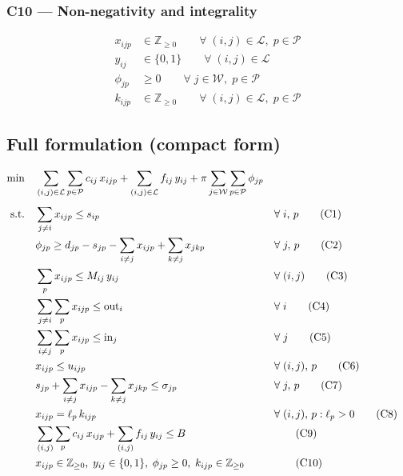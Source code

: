 \documentclass[11pt, a4paper]{article}
\begin{document}
\subsubsection*{C10 — Non-negativity and integrality}

\begin{align}
  x_{ijp} &\in \mathbb{Z}_{\geq 0}
    \qquad \forall\; (i,j) \in \mathcal{L},\; p \in \mathcal{P}
    \tag{C10a} \\
  y_{ij}  &\in \{0,1\}
    \qquad \forall\; (i,j) \in \mathcal{L}
    \tag{C10b} \\
  \phi_{jp} &\geq 0
    \qquad \forall\; j \in \mathcal{W},\; p \in \mathcal{P}
    \tag{C10c} \\
  k_{ijp} &\in \mathbb{Z}_{\geq 0}
    \qquad \forall\; (i,j) \in \mathcal{L},\; p \in \mathcal{P}
    \tag{C10d}
\end{align}

\subsection{Full formulation (compact form)}

\begin{align}
\min \quad
  & \sum_{(i,j)\in\mathcal{L}}\sum_{p\in\mathcal{P}} c_{ij}\, x_{ijp}
    + \sum_{(i,j)\in\mathcal{L}} f_{ij}\, y_{ij}
    + \pi \sum_{j\in\mathcal{W}}\sum_{p\in\mathcal{P}} \phi_{jp}
    \notag \\[4pt]
\text{s.t.} \quad
  & \sum_{j \neq i} x_{ijp} \leq s_{ip}
    && \forall\; i,\, p
    \tag{C1} \\
  & \phi_{jp} \geq d_{jp} - s_{jp}
    - \sum_{i \neq j} x_{ijp} + \sum_{k \neq j} x_{jkp}
    && \forall\; j,\, p
    \tag{C2} \\
  & \sum_{p} x_{ijp} \leq M_{ij}\, y_{ij}
    && \forall\; (i,j)
    \tag{C3} \\
  & \sum_{j \neq i}\sum_{p} x_{ijp} \leq \text{out}_{i}
    && \forall\; i
    \tag{C4} \\
  & \sum_{i \neq j}\sum_{p} x_{ijp} \leq \text{in}_{j}
    && \forall\; j
    \tag{C5} \\
  & x_{ijp} \leq u_{ijp}
    && \forall\; (i,j),\, p
    \tag{C6} \\
  & s_{jp} + \sum_{i \neq j} x_{ijp} - \sum_{k \neq j} x_{jkp}
    \leq \sigma_{jp}
    && \forall\; j,\, p
    \tag{C7} \\
  & x_{ijp} = \ell_p\, k_{ijp}
    && \forall\; (i,j),\, p : \ell_p > 0
    \tag{C8} \\
  & \sum_{(i,j)}\sum_{p} c_{ij}\, x_{ijp}
    + \sum_{(i,j)} f_{ij}\, y_{ij} \leq B
    && \tag{C9} \\
  & x_{ijp} \in \mathbb{Z}_{\geq 0},\;
    y_{ij} \in \{0,1\},\;
    \phi_{jp} \geq 0,\;
    k_{ijp} \in \mathbb{Z}_{\geq 0}
    && \tag{C10}
\end{align}
\end{document}

